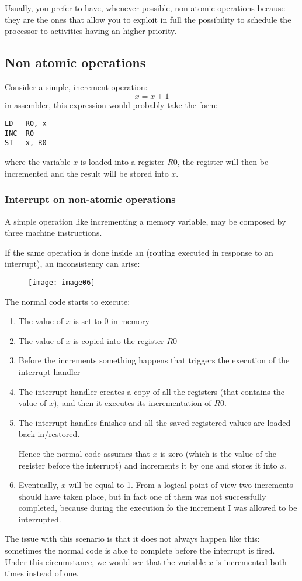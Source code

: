 Usually, you prefer to have, whenever possible, non atomic operations because they are the ones that allow you to exploit in full the possibility to schedule the processor to activities having an higher priority.

\subsection{Non atomic operations}
Consider a simple, increment operation:
\[x=x+1\]
in assembler, this expression would probably take the form:
\begin{lstlisting}[language={[x86masm]Assembler}]
LD   R0, x
INC  R0
ST   x, R0
\end{lstlisting}
where the variable $x$ is loaded into a register $R0$, the register will then be incremented and the result will be stored into $x$.

\subsubsection{Interrupt on non-atomic operations}

A simple operation like incrementing a memory variable, may be composed by three machine instructions.

If the same operation is done inside an  (routing executed in response to an interrupt), an inconsistency can arise:
\begin{figure}[!h]
\centering
\texttt{[image: image06]}
\end{figure}
The normal code starts to execute:
\begin{enumerate}
\item The value of $x$ is set to 0 in memory
\item The value of $x$ is copied into the register $R0$
\item Before the increments something happens that triggers the execution of the interrupt handler
\item The interrupt handler creates a copy of all the registers (that contains the value of $x$), and then it executes its incrementation of $R0$.
\item The interrupt handles finishes and all the saved registered values are loaded back in/restored.

Hence the normal code assumes that $x$ is zero (which is the value of the register before the interrupt) and increments it by one and stores it into $x$.
\item Eventually, $x$ will be equal to 1. From a logical point of view two increments should have taken place, but in fact one of them was not successfully completed, because during the execution fo the increment I was allowed to be interrupted.
\end{enumerate}
The issue with this scenario is that it does not always happen like this: sometimes the normal code is able to complete before the interrupt is fired.
Under this circumstance, we would see that the variable $x$ is incremented both times instead of one.


